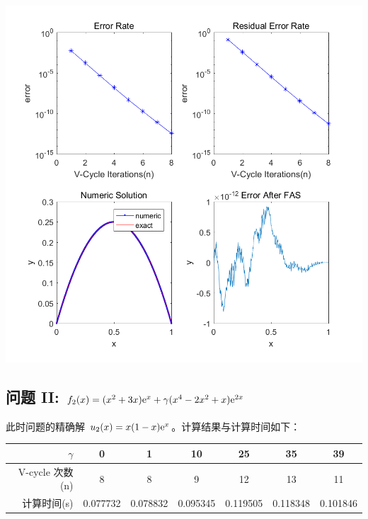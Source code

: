 \documentclass{article}
\begin{document}
\includegraphics[width=\textwidth]{figure1.png}

\subsection*{问题 II: $f_2(x) = (x^2 + 3x){\mathrm e}^x + \gamma (x^4 - 2x^2 + x){\mathrm e}^{2x}$}
此时问题的精确解 $u_2(x) = x(1-x){\mathrm e}^x$。计算结果与计算时间如下：

\begin{tabular}{r|cccccc}
    \toprule
    $\gamma$        & 0        & 1        & 10       & 25       & 35       & 39       \\
    \midrule
    V-cycle 次数(n) & 8        & 8        & 9        & 12       & 13       & 11       \\
    计算时间(s)     & 0.077732 & 0.078832 & 0.095345 & 0.119505 & 0.118348 & 0.101846 \\
    \bottomrule
\end{tabular}
\end{document}
